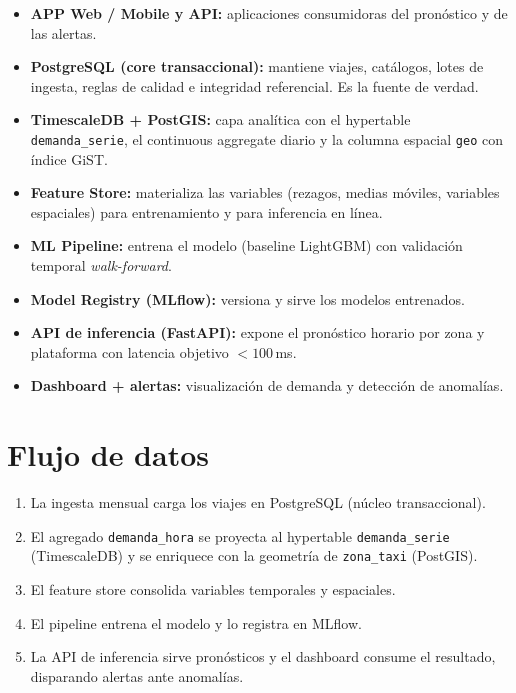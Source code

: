 \documentclass[11pt,a4paper]{article}
\begin{document}
\begin{itemize}
  \item \textbf{APP Web / Mobile y API:} aplicaciones consumidoras del pronóstico y de las
        alertas.
  \item \textbf{PostgreSQL (core transaccional):} mantiene viajes, catálogos, lotes de ingesta,
        reglas de calidad e integridad referencial. Es la fuente de verdad.
  \item \textbf{TimescaleDB + PostGIS:} capa analítica con el hypertable
        \texttt{demanda\_serie}, el continuous aggregate diario y la columna espacial
        \texttt{geo} con índice GiST.
  \item \textbf{Feature Store:} materializa las variables (rezagos, medias móviles, variables
        espaciales) para entrenamiento y para inferencia en línea.
  \item \textbf{ML Pipeline:} entrena el modelo (baseline LightGBM) con validación temporal
        \emph{walk-forward}.
  \item \textbf{Model Registry (MLflow):} versiona y sirve los modelos entrenados.
  \item \textbf{API de inferencia (FastAPI):} expone el pronóstico horario por zona y
        plataforma con latencia objetivo $<100$\,ms.
  \item \textbf{Dashboard + alertas:} visualización de demanda y detección de anomalías.
\end{itemize}

\section{Flujo de datos}

\begin{enumerate}
  \item La ingesta mensual carga los viajes en PostgreSQL (núcleo transaccional).
  \item El agregado \texttt{demanda\_hora} se proyecta al hypertable
        \texttt{demanda\_serie} (TimescaleDB) y se enriquece con la geometría de
        \texttt{zona\_taxi} (PostGIS).
  \item El feature store consolida variables temporales y espaciales.
  \item El pipeline entrena el modelo y lo registra en MLflow.
  \item La API de inferencia sirve pronósticos y el dashboard consume el resultado,
        disparando alertas ante anomalías.
\end{enumerate}
\end{document}
